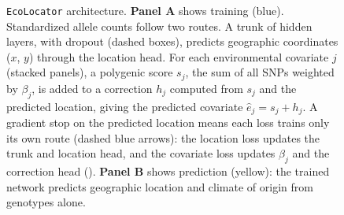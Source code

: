 \documentclass[]{article}
\newcommand{\ecolocator}{\texttt{EcoLocator}\xspace}
\begin{document}
\begin{figure}[H]
    \caption{\ecolocator architecture. \textbf{Panel A} shows training (blue).
    Standardized allele counts follow two routes. A trunk of hidden layers,
    with dropout (dashed boxes), predicts geographic coordinates ($x$, $y$) through
    the location head. For each environmental covariate $j$ (stacked panels), a
    polygenic score $s_j$, the sum of all SNPs weighted by $\beta_j$, is added to a
    correction $h_j$ computed from $s_j$ and the predicted location, giving the
    predicted covariate $\hat{e}_j = s_j + h_j$. A gradient stop on the predicted
    location means each loss trains only its own route (dashed blue arrows): the
    location loss updates the trunk and location head, and the covariate loss
    updates $\beta_j$ and the correction head (). \textbf{Panel B} shows
    prediction (yellow): the trained network predicts
    geographic location and climate of origin from genotypes alone.}
    \label{fig:architecture}
\end{figure}
\end{document}
